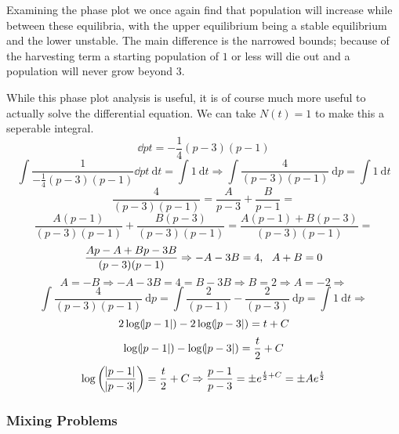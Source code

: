 \documentclass[12pt]{report}
\begin{document}
\begin{flushleft}
Examining the phase plot we once again find that population will increase while
between these equilibria, with the upper equilibrium being a stable equilibrium
and the lower unstable. The main difference is the narrowed bounds; because of
the harvesting term a starting population of \(1\) or less will die out and a
population will never grow beyond \(3\). \par
While this phase plot analysis is useful, it is of course much more useful to
actually solve the differential equation. We can take \(N(t) = 1\) to make this
a seperable integral.
\[\dd{p}{t} = -\frac{1}{4}(p - 3)(p - 1)\]
\[\int \frac{1}{-\frac{1}{4}(p - 3)(p - 1)} \dd{p}{t} \:\mathrm{d}t = \int        
1 \:\mathrm{d}t \Rightarrow \int \frac{4}{(p - 3)(p - 1)} \:\mathrm{d}p 
= \int 1 \:\mathrm{d}t\]
\[\frac{4}{(p - 3)(p - 1)} = \frac{A}{p - 3} + \frac{B}{p - 1} = \]
\[\frac{A(p - 1)}{(p - 3)(p - 1)} + \frac{B(p - 3)}{(p - 3)(p - 1)}
= \frac{A(p - 1) + B(p - 3)}{(p - 3)(p - 1)} = \]
\[\frac{Ap - A + Bp - 3B}{(p - 3)(p - 1)} \Rightarrow -A - 3B = 4
, \:\:\: A + B = 0\]
\[A = -B \Rightarrow -A - 3B = 4 = B - 3B \Rightarrow B = 2 \Rightarrow A =-2
\Rightarrow\]
\[\int \frac{4}{(p - 3)(p - 1)} \:\mathrm{d}p = \int \frac{2}{(p - 1)} 
- \frac{2}{(p - 3)} \:\mathrm{d}p = \int 1 \:\mathrm{d}t \Rightarrow\]
\[2\log(\abs{p - 1}) - 2\log(\abs{p - 3}) = t + C\]
\[\log(\abs{p - 1}) - \log(\abs{p - 3}) = \frac{t}{2} + C\]
\[\log\left(\frac{\abs{p - 1}}{\abs{p - 3}}\right) = \frac{t}{2} + C\Rightarrow
\frac{p - 1}{p - 3} = \pm e^{\frac{t}{2} + C} =\pm Ae^\frac{t}{2}\]

\subsubsection*{Mixing Problems}


\end{flushleft}
\end{document}
